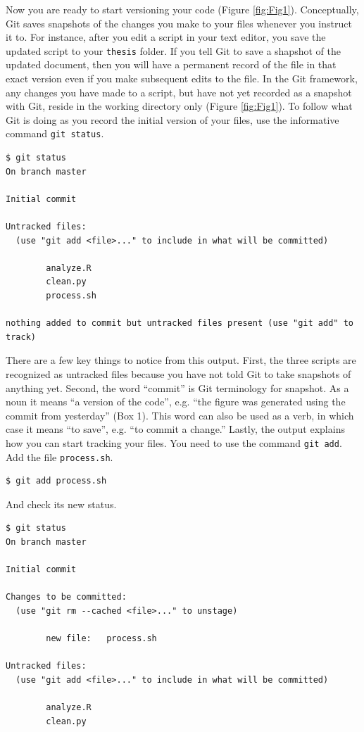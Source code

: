 \documentclass[10pt]{article}
\begin{document}
Now you are ready to start versioning your code (Figure \ref{fig:Fig1}).
Conceptually, Git saves snapshots of the changes you make to your files whenever you instruct it to.
For instance, after you edit a script in your text editor, you save the updated script to your \verb|thesis| folder.
If you tell Git to save a shapshot of the updated document, then you will have a permanent record of the file in that exact version even if you make subsequent edits to the file.
In the Git framework, any changes you have made to a script, but have not yet recorded as a snapshot with Git, reside in the working directory only (Figure \ref{fig:Fig1}).
To follow what Git is doing as you record the initial version of your files, use the informative command \verb|git status|.

\begin{verbatim}
$ git status
On branch master

Initial commit

Untracked files:
  (use "git add <file>..." to include in what will be committed)

        analyze.R
        clean.py
        process.sh

nothing added to commit but untracked files present (use "git add" to track)
\end{verbatim}

There are a few key things to notice from this output.
First, the three scripts are recognized as untracked files because you have not told Git to take snapshots of anything yet.
Second, the word ``commit'' is Git terminology for snapshot.
As a noun it means ``a version of the code'', e.g. ``the figure was generated using the commit from yesterday'' (Box 1).
This word can also be used as a verb, in which case it means ``to save'', e.g. ``to commit a change.''
Lastly, the output explains how you can start tracking your files.
You need to use the command \verb|git add|.
Add the file \verb|process.sh|.

\begin{verbatim}
$ git add process.sh
\end{verbatim}

And check its new status.

\begin{verbatim}
$ git status
On branch master

Initial commit

Changes to be committed:
  (use "git rm --cached <file>..." to unstage)

        new file:   process.sh

Untracked files:
  (use "git add <file>..." to include in what will be committed)

        analyze.R
        clean.py
\end{verbatim}
\end{document}
